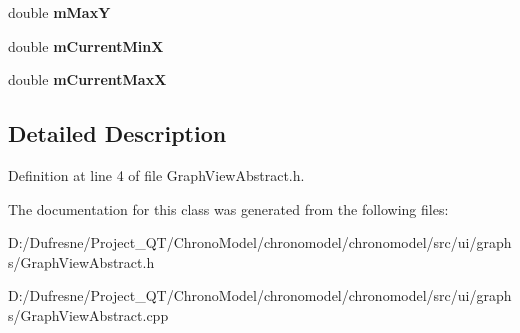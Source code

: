 \begin{DoxyCompactItemize}
\item 
\hypertarget{class_graph_view_abstract_a21a71a51495598d775b97a210f9790ed}{double {\bfseries m\-Max\-Y}}\label{class_graph_view_abstract_a21a71a51495598d775b97a210f9790ed}

\item 
\hypertarget{class_graph_view_abstract_a072b8b821f3dde4ba190e9abde9f2d98}{double {\bfseries m\-Current\-Min\-X}}\label{class_graph_view_abstract_a072b8b821f3dde4ba190e9abde9f2d98}

\item 
\hypertarget{class_graph_view_abstract_a009b10bcb7520c7efbdac38a2b4cc779}{double {\bfseries m\-Current\-Max\-X}}\label{class_graph_view_abstract_a009b10bcb7520c7efbdac38a2b4cc779}

\end{DoxyCompactItemize}


\subsection{Detailed Description}


Definition at line 4 of file Graph\-View\-Abstract.\-h.



The documentation for this class was generated from the following files\-:\begin{DoxyCompactItemize}
\item 
D\-:/\-Dufresne/\-Project\-\_\-\-Q\-T/\-Chrono\-Model/chronomodel/chronomodel/src/ui/graphs/Graph\-View\-Abstract.\-h\item 
D\-:/\-Dufresne/\-Project\-\_\-\-Q\-T/\-Chrono\-Model/chronomodel/chronomodel/src/ui/graphs/Graph\-View\-Abstract.\-cpp\end{DoxyCompactItemize}
